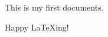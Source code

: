 \documentclass{article}
\begin{document}
This is my first documents.

Happy \LaTeX ing!
\end{document}
